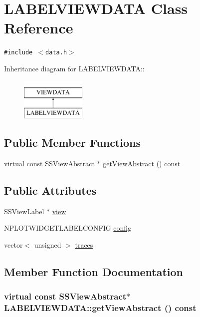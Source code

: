 \hypertarget{class_l_a_b_e_l_v_i_e_w_d_a_t_a}{
\section{LABELVIEWDATA Class Reference}
\label{class_l_a_b_e_l_v_i_e_w_d_a_t_a}
}
{\tt \#include $<$data.h$>$}

Inheritance diagram for LABELVIEWDATA::\begin{figure}[H]
\begin{center}
\leavevmode
\includegraphics[height=2cm]{class_l_a_b_e_l_v_i_e_w_d_a_t_a}
\end{center}
\end{figure}
\subsection*{Public Member Functions}
\begin{CompactItemize}
\item 
virtual const SSViewAbstract $\ast$ \hyperlink{class_l_a_b_e_l_v_i_e_w_d_a_t_a_63c4ddf89ce52628c8beab252c4c4ba2}{getViewAbstract} () const 
\end{CompactItemize}
\subsection*{Public Attributes}
\begin{CompactItemize}
\item 
SSViewLabel $\ast$ \hyperlink{class_l_a_b_e_l_v_i_e_w_d_a_t_a_d315808823af5c15767c1100bc226074}{view}
\item 
NPLOTWIDGETLABELCONFIG \hyperlink{class_l_a_b_e_l_v_i_e_w_d_a_t_a_932c69aa990d980c0240d2f200e5fda6}{config}
\item 
vector$<$ unsigned $>$ \hyperlink{class_l_a_b_e_l_v_i_e_w_d_a_t_a_7bd9372bf57d18700d287c7fc3531295}{traces}
\end{CompactItemize}


\subsection{Member Function Documentation}
\hypertarget{class_l_a_b_e_l_v_i_e_w_d_a_t_a_63c4ddf89ce52628c8beab252c4c4ba2}{
\subsubsection[{getViewAbstract}]{\setlength{\rightskip}{0pt plus 5cm}virtual const SSViewAbstract$\ast$ LABELVIEWDATA::getViewAbstract () const}}
\label{class_l_a_b_e_l_v_i_e_w_d_a_t_a_63c4ddf89ce52628c8beab252c4c4ba2}




